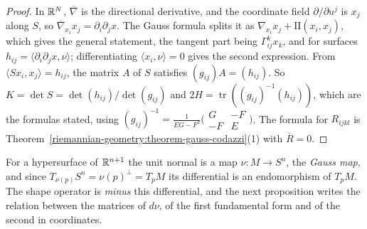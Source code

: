 \begin{proof}
In $\mathbb{R}^N$, $\overline{\nabla}$ is the directional derivative, and the coordinate field $\partial/\partial u^j$ is $x_j$ along $S$, so
$\overline{\nabla}_{x_i}x_j = \partial_i\partial_jx$. The Gauss formula splits it as $\nabla_{x_i}x_j + \mathrm{II}(x_i, x_j)$, which gives the general statement, the tangent part
being $\Gamma^k_{ij}x_k$, and for surfaces $h_{ij} = \langle\partial_i\partial_jx, \nu\rangle$; differentiating $\langle x_i, \nu\rangle = 0$ gives the second expression. From
$\langle Sx_i, x_j\rangle = h_{ij}$, the matrix $A$ of $S$ satisfies $(g_{ij})A = (h_{ij})$. So $K = \det S = \det(h_{ij})/\det(g_{ij})$ and
$2H = \operatorname{tr}((g_{ij})^{-1}(h_{ij}))$, which are the formulas stated, using $(g_{ij})^{-1} = \frac{1}{EG - F^2}\bigl(\begin{smallmatrix} G & -F\\ -F & E\end{smallmatrix}\bigr)$. The
formula for $R_{ijkl}$ is Theorem~\ref{riemannian-geometry:theorem-gauss-codazzi}(1) with $\overline{R} = 0$.
\end{proof}

For a hypersurface of $\mathbb{R}^{n+1}$ the unit normal is a map $\nu \colon M \to S^n$, the \emph{Gauss map}, and since $T_{\nu(p)}S^n = \nu(p)^\perp = T_pM$ its
differential is an endomorphism of $T_pM$. The shape operator is \emph{minus} this differential, and the next proposition writes the relation between the matrices
of $d\nu$, of the first fundamental form and of the second in coordinates.

